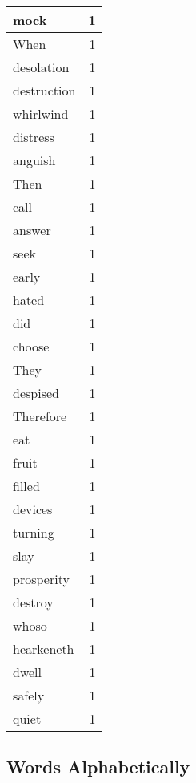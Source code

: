 \begin{center}
\begin{longtable}{l|r}
mock & 1\\ \hline 
When & 1\\ \hline 
desolation & 1\\ \hline 
destruction & 1\\ \hline 
whirlwind & 1\\ \hline 
distress & 1\\ \hline 
anguish & 1\\ \hline 
Then & 1\\ \hline 
call & 1\\ \hline 
answer & 1\\ \hline 
seek & 1\\ \hline 
early & 1\\ \hline 
hated & 1\\ \hline 
did & 1\\ \hline 
choose & 1\\ \hline 
They & 1\\ \hline 
despised & 1\\ \hline 
Therefore & 1\\ \hline 
eat & 1\\ \hline 
fruit & 1\\ \hline 
filled & 1\\ \hline 
devices & 1\\ \hline 
turning & 1\\ \hline 
slay & 1\\ \hline 
prosperity & 1\\ \hline 
destroy & 1\\ \hline 
whoso & 1\\ \hline 
hearkeneth & 1\\ \hline 
dwell & 1\\ \hline 
safely & 1\\ \hline 
quiet & 1\\ \hline 
\end{longtable}  
\end{center}  


  
\normalsize  

  
  


\subsection{Words Alphabetically}

